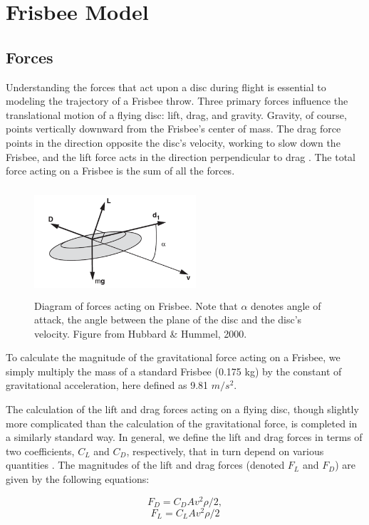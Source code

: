 \documentclass[a4paper,12pt, oneside]{article}
\begin{document}
\section{Frisbee Model}

\subsection{Forces}
Understanding the forces that act upon a disc during flight is essential to modeling the trajectory of a Frisbee throw. Three primary forces influence the translational motion of a flying disc: lift, drag, and gravity. Gravity, of course, points vertically downward from the Frisbee's center of mass.  The drag force points in the direction opposite the disc's velocity, working to slow down the Frisbee, and the lift force acts in the direction perpendicular to drag \cite{H3}. The total force acting on a Frisbee is the sum of all the forces.
\begin{figure}[h]
        \includegraphics[width=6cm, height=4cm]{frisforces}
	\centering
	\caption{Diagram of forces acting on Frisbee. Note that $\alpha$ denotes angle of attack, the angle between the plane of the disc and the disc's velocity. Figure from Hubbard \& Hummel, 2000. \cite{hubbardandhummel}}
	\label{fig:discforces1}
\end{figure}
To calculate the magnitude of the gravitational force acting on a Frisbee, we simply multiply the mass of a standard Frisbee (0.175 kg) by the constant of gravitational acceleration, here defined as  9.81 $m/s^{2}.$ 
 
The calculation of the lift and drag forces acting on a flying disc, though slightly more complicated than the calculation of the gravitational force, is completed in a similarly standard way. In general, we define the lift and drag forces in terms of two coefficients, $C_L$ and $C_D$, respectively, that in turn depend on various quantities \cite{H3}. The magnitudes of the lift and drag forces (denoted $F_L$ and $F_D$) are given by the following equations:

\begin{equation}
  F_D=C_DAv^2\rho/2,
\end{equation}
\begin{equation}
  F_L=C_LAv^2\rho/2
\end{equation}
\end{document}
